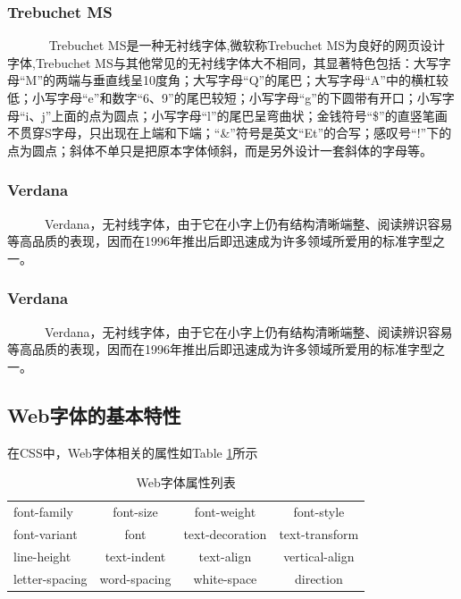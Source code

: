 \documentclass[a4paper]{article}
\begin{document}
	\subsubsection{Trebuchet MS} 
	
~~~~~~	 Trebuchet MS是一种无衬线字体,微软称Trebuchet MS为良好的网页设计字体,Trebuchet MS与其他常见的无衬线字体大不相同，其显著特色包括：大写字母“M”的两端与垂直线呈10度角；大写字母“Q”的尾巴；大写字母“A”中的横杠较低；小写字母“e”和数字“6、9”的尾巴较短；小写字母“g”的下圆带有开口；小写字母“i、j”上面的点为圆点；小写字母“l”的尾巴呈弯曲状；金钱符号“\$”的直竖笔画不贯穿S字母，只出现在上端和下端；“\&”符号是英文“Et”的合写；感叹号“!”下的点为圆点；斜体不单只是把原本字体倾斜，而是另外设计一套斜体的字母等。
   
	\subsubsection{Verdana} 
	
~~~~~~Verdana，无衬线字体，由于它在小字上仍有结构清晰端整、阅读辨识容易等高品质的表现，因而在1996年推出后即迅速成为许多领域所爱用的标准字型之一。
	\subsubsection{Verdana} 
	
~~~~~~Verdana，无衬线字体，由于它在小字上仍有结构清晰端整、阅读辨识容易等高品质的表现，因而在1996年推出后即迅速成为许多领域所爱用的标准字型之一。
    

\subsection{Web字体的基本特性}

在CSS中，Web字体相关的属性如Table \ref{tb1}所示

\begin{table}[h]
\centering
\begin{tabular}{lccc}  %
\hline
font-family	 &font-size &font-weight &font-style\\         %
font-variant &font &text-decoration &text-transform\\        %
line-height &text-indent &text-align &vertical-align\\ 
letter-spacing & word-spacing & white-space & direction\\ \hline
\end{tabular}
\caption{Web字体属性列表}
\label{tb1}
\end{table}
\end{document}

